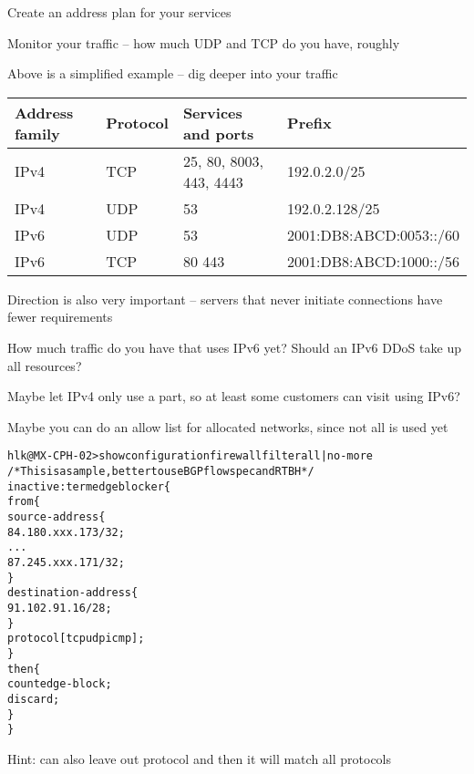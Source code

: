 \documentclass[Screen16to9,17pt]{foils}
\begin{document}
\begin{list2}
\item Create an address plan for your services
\item Monitor your traffic -- how much UDP and TCP do you have, roughly

\item Above is a simplified example -- dig deeper into your traffic
\end{list2}


\begin{tabularx}{\textwidth-5cm}{|p{2cm}|p{2cm}|p{7cm}|X|} \hline
{\bf Address family} & {\bf Protocol} & {\bf Services and ports} & {\bf Prefix}\\\hline
IPv4 & TCP & 25, 80, 8003, 443, 4443 & 192.0.2.0/25 \\\hline
IPv4 & UDP & 53 & 192.0.2.128/25 \\\hline
IPv6 & UDP & 53  & 2001:DB8:ABCD:0053::/60 \\\hline
IPv6 & TCP & 80 443 & 2001:DB8:ABCD:1000::/56 \\\hline
\end{tabularx}

\begin{list2}
\item Direction is also very important -- servers that never initiate connections have fewer requirements
\item How much traffic do you have that uses IPv6 yet? Should an IPv6 DDoS take up all resources?
\item Maybe let IPv4 only use a part, so at least some customers can visit using IPv6?
\item Maybe you can do an allow list for allocated networks, since not all is used yet
\end{list2}



\begin{alltt}\footnotesize
hlk@MX-CPH-02> show configuration firewall filter all | no-more
/* This is a sample, better to use BGP flowspec and RTBH */
inactive: term edgeblocker \{
    from \{
        source-address \{
            84.180.xxx.173/32;
...
            87.245.xxx.171/32;
        \}
        destination-address \{
            91.102.91.16/28;
        \}
        protocol [ tcp udp icmp ];
    \}
    then \{
        count edge-block;
        discard;
    \}
\}
\end{alltt}
Hint: can also leave out protocol and then it will match all protocols
\end{document}
